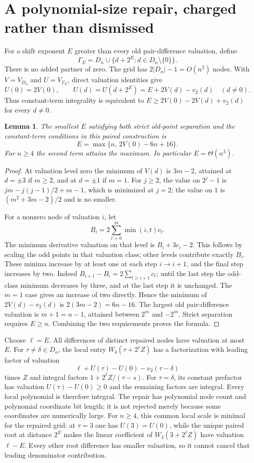 \documentclass[11pt]{article}
\newtheorem{lemma}{Lemma}
\begin{document}
\section{A polynomial-size repair, charged rather than dismissed}
For a shift exponent $E$ greater than every old pair-difference
valuation, define
\[
 \Gamma_E=D_n\cup\{d+2^E:d\in D_n\setminus\{0\}\}.
\]
There is no added partner of zero. The grid has $2|D_n|-1=O(n^2)$ nodes.
With $V=V_{D_n}$ and $U=V_{\Gamma_E}$, direct valuation identities give
\begin{equation}
 U(0)=2V(0),\qquad
 U(d)=U(d+2^E)=E+2V(d)-v_2(d)\quad(d\ne0).
 \label{eq:repair}
\end{equation}
Thus constant-term integrality is equivalent to
$E\ge2V(0)-2V(d)+v_2(d)$ for every $d\ne0$.

\begin{lemma}
The smallest $E$ satisfying both strict old-point separation and
the constant-term conditions in this paired construction is
\[
 E=\max\{n,\,2V(0)-6n+16\}.
\]
For $n\ge4$ the second term attains the maximum. In particular
$E=\Theta(n^3)$.
\end{lemma}
\begin{proof}
At valuation level zero the minimum of $V(d)$ is $3m-2$, attained
at $d=\pm3$ if $m\ge2$, and at $d=\pm1$ if $m=1$.
For $j\ge2$, the value on $2^j-1$ is
$jm-j(j-1)/2+m-1$, which is minimized at $j=2$;
the value on $1$ is $(m^2+3m-2)/2$ and is no smaller.

For a nonzero node of valuation $i$, let
\[
 B_i=2\sum_{t=0}^m\min(i,t)c_t.
\]
The minimum derivative valuation on that level is
$B_i+3c_i-2$. This follows by scaling the odd points in that
valuation class; other levels contribute exactly $B_i$.
These minima increase by at least one at each step $i\to i+1$,
and the final step increases by two. Indeed
$B_{i+1}-B_i=2\sum_{t\ge i+1}c_t$; until the last step the odd-class
minimum decreases by three, and at the last step it is unchanged.
The $m=1$ case gives an increase of two directly.
Hence the minimum of $2V(d)-v_2(d)$ is $2(3m-2)=6n-16$.
The largest old pair-difference valuation is $m+1=n-1$, attained
between $2^m$ and $-2^m$. Strict separation requires $E\ge n$.
Combining the two requirements proves the formula.
\end{proof}

Choose $\ell=E$. All differences of distinct repaired nodes have
valuation at most $E$. For $\tau\ne\delta\in D_n$, the local entry
$W_\delta(\tau+2^\ell Z)$ has a factorization with leading factor of
valuation
\[
 \ell+U(\tau)-U(0)-v_2(\tau-\delta)
\]
times $Z$ and integral factors $1+2^\ell Z/(\tau-s)$.
For $\tau=\delta$, its constant prefactor has valuation
$U(\tau)-U(0)\ge0$ and the remaining factors are integral.
Every local polynomial is therefore integral. The repair has polynomial
node count and polynomial coordinate bit length; it is not rejected
merely because some coordinates are numerically large.
For $n\ge4$, this common local scale is minimal for the repaired grid:
at $\tau=3$ one has $U(3)=U(0)$, while the unique paired root at distance
$2^E$ makes the linear coefficient of $W_3(3+2^\ell Z)$ have valuation
$\ell-E$. Every other root difference has smaller valuation, so it
cannot cancel that leading denominator contribution.
\end{document}
